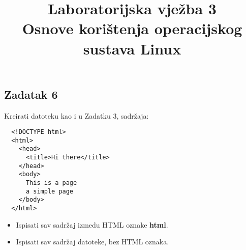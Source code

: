\documentclass[12pt,a4paper]{article}
\begin{document}
	\title{Laboratorijska vježba 3\\{\small Osnove korištenja operacijskog sustava Linux}\vspace{-2em}}
	\maketitle
	
	\subsection*{Zadatak 6}
  Kreirati datoteku kao i u Zadatku 3, sadržaja:
	\begin{verbatim}
  <!DOCTYPE html>
  <html>
    <head>
      <title>Hi there</title>
    </head>
    <body>
      This is a page
      a simple page
    </body>
  </html>
	\end{verbatim}
	\begin{itemize}
    \item Ispisati sav sadržaj izmedu HTML oznake \textbf{html}.
    \item Ispisati sav sadržaj datoteke, bez HTML oznaka.
	\end{itemize}
\end{document}
